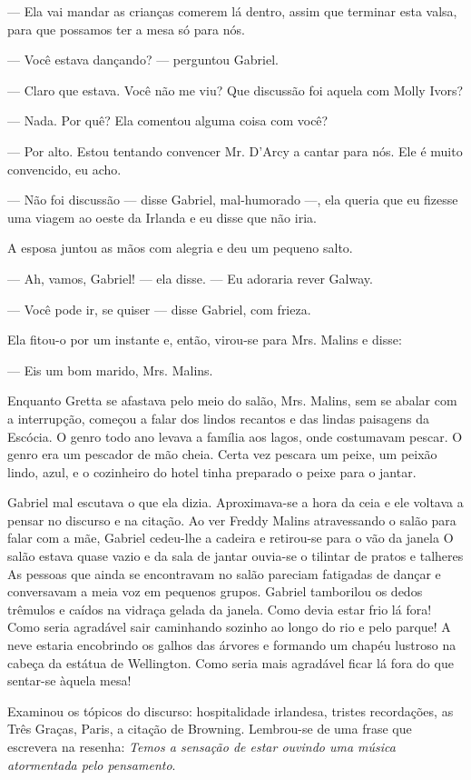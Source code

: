 --- Ela vai mandar as crianças comerem lá dentro, assim que
terminar esta valsa, para que possamos ter a mesa só para nós.

--- Você estava dançando? --- perguntou Gabriel.

--- Claro que estava. Você não me viu? Que discussão foi aquela com
Molly Ivors?

--- Nada. Por quê? Ela comentou alguma coisa com você?

--- Por alto. Estou tentando convencer Mr. D'Arcy a cantar para nós.
Ele é muito convencido, eu acho.

--- Não foi discussão --- disse Gabriel, mal-humorado ---, ela queria
que eu fizesse uma viagem ao oeste da Irlanda e eu disse que não iria.

A esposa juntou as mãos com alegria e deu um pequeno salto.

--- Ah, vamos, Gabriel! --- ela disse. --- Eu adoraria rever Galway.

--- Você pode ir, se quiser --- disse Gabriel, com frieza.

Ela fitou-o por um instante e, então, virou-se para Mrs. Malins e
disse:

--- Eis um bom marido, Mrs. Malins.

Enquanto Gretta se afastava pelo meio do salão, Mrs. Malins, sem se
abalar com a interrupção, começou a falar dos lindos recantos e
das lindas paisagens da Escócia. O genro todo ano levava a família aos
lagos, onde costumavam pescar. O genro era um pescador de mão cheia.
Certa vez pescara um peixe, um peixão lindo, azul, e o cozinheiro do
hotel tinha preparado o peixe para o jantar.

Gabriel mal escutava o que ela dizia. Aproximava-se a hora da ceia e
ele voltava a pensar no discurso e na citação. Ao ver Freddy Malins
atravessando o salão para falar com a mãe, Gabriel cedeu-lhe a
cadeira e retirou-se para o vão da janela O salão estava quase vazio e
da sala de jantar ouvia-se o tilintar de pratos e talheres As pessoas
que ainda se encontravam no salão pareciam fatigadas de dançar e
conversavam a meia voz em pequenos grupos. Gabriel tamborilou os dedos
trêmulos e caídos na vidraça gelada da janela. Como devia estar frio
lá fora! Como seria agradável sair caminhando sozinho ao longo do rio
e pelo parque! A neve estaria encobrindo os galhos das árvores e
formando um chapéu lustroso na cabeça da estátua de Wellington. Como
seria mais agradável ficar lá fora do que sentar-se àquela mesa!

Examinou os tópicos do discurso: hospitalidade irlandesa, tristes
recordações, as Três Graças, Paris, a citação de Browning. Lembrou-se
de uma frase que escrevera na resenha: \textit{Temos a sensação de estar
ouvindo uma música atormentada pelo pensamento}.

